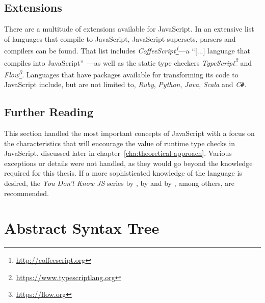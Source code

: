 

\subsection{Extensions}
\label{sec:javascript-extensions}

There are a multitude of extensions available for JavaScript. In \cite{LanguagesThatCompileToJS:CoffeeScript:2017} an extensive list of languages that compile to JavaScript, JavaScript supersets, parsers and compilers can be found. That list includes \emph{CoffeeScript\footnote{\url{http://coffeescript.org}}}---a ``[...] language that compiles into JavaScript''~\cite{CoffeeScript}---as well as the static type checkers \emph{TypeScript\footnote{\url{https://www.typescriptlang.org}}} and \emph{Flow\footnote{\url{https://flow.org}}}. Languages that have packages available for transforming its code to JavaScript include, but are not limited to, \emph{Ruby}, \emph{Python}, \emph{Java}, \emph{Scala} and \emph{C\texttt{\#}}.

\subsection{Further Reading}
\label{sec:further reading}


This section handled the most important concepts of JavaScript with a focus on the characteristics that will encourage the value of runtime type checks in JavaScript, discussed later in chapter~\ref{cha:theoretical-approach}. Various exceptions or details were not handled, as they would go beyond the knowledge required for this thesis. If a more sophisticated knowledge of the language is desired, the \emph{You Don't Know JS} series by \citeauthor{YDKJS:UpAndGoing:Simpson:2015}, \emph{\emph{}} by \citeauthor{JavaScriptTheGoodParts:Crockford:2008} and \emph{\emph{}} by \citeauthor{JavaScriptTheDefinitiveGuide:Flanagan:2011}, among others, are recommended.

\section{Abstract Syntax Tree}
\label{sec:ast}

